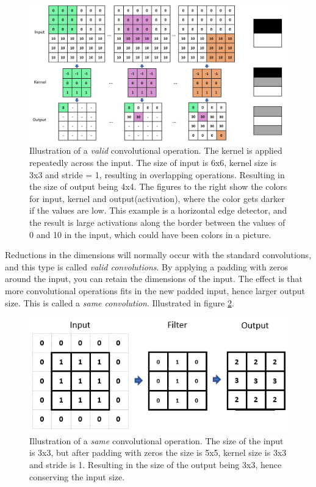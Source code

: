     \begin{figure}[H]
        \centering
        \includegraphics[scale=0.4]{figures/convolutions.png}
        \caption[Horizontal edge detector example]{Illustration of a \textit{valid} convolutional operation. The kernel is applied repeatedly across the input. The size of input is 6x6, kernel size is 3x3 and stride = 1, resulting in overlapping operations. Resulting in the size of output being 4x4. The figures to the right show the colors for input, kernel and output(activation), where the color gets darker if the values are low. This example is a horizontal edge detector, and the result is large activations along the border between the values of 0 and 10 in the input, which could have been colors in a picture. }
      	\medskip 
        \label{convolutional_fig}
    \end{figure}
    
    Reductions in the dimensions\cite{o2015introduction_convolutions} will normally occur with the standard convolutions, and this type is called \textit{valid convolutions}. By applying a padding with zeros around the input, you can retain the dimensions of the input. The effect is that more convolutional operations fits in the new padded input, hence larger output size. This is called a \textit{same convolution}. Illustrated in figure \ref{same_convolutional_fig}.
    
    \begin{figure}[H]
        \centering
        \includegraphics[scale=0.5]{figures/same_convolutions.png}
        \caption[Same convolution example]{Illustration of a \textit{same} convolutional operation. The size of the input is 3x3, but after padding with zeros the size is 5x5, kernel size is 3x3 and stride is 1. Resulting in the size of the output being 3x3, hence conserving the input size.}
      	\medskip 
        \label{same_convolutional_fig}
    \end{figure}
    
